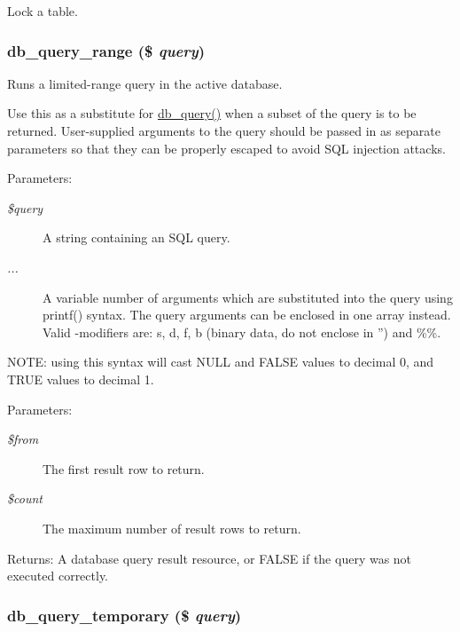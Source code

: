 Lock a table. \hypertarget{database_8mysql_8inc_893cbcab2ecf321005eae4e278adc22b}{
\subsubsection[{db\_\-query\_\-range}]{\setlength{\rightskip}{0pt plus 5cm}db\_\-query\_\-range (\$ {\em query})}}
\label{database_8mysql_8inc_893cbcab2ecf321005eae4e278adc22b}


Runs a limited-range query in the active database.

Use this as a substitute for \hyperlink{database_8mysql-common_8inc_9e096321b86945d128746ac7bedce8f3}{db\_\-query()} when a subset of the query is to be returned. User-supplied arguments to the query should be passed in as separate parameters so that they can be properly escaped to avoid SQL injection attacks.

\begin{Desc}
\item[Parameters:]
\begin{description}
\item[{\em \$query}]A string containing an SQL query. \item[{\em ...}]A variable number of arguments which are substituted into the query using printf() syntax. The query arguments can be enclosed in one array instead. Valid -modifiers are: s, d, f, b (binary data, do not enclose in '') and \%\%.\end{description}
\end{Desc}
NOTE: using this syntax will cast NULL and FALSE values to decimal 0, and TRUE values to decimal 1.

\begin{Desc}
\item[Parameters:]
\begin{description}
\item[{\em \$from}]The first result row to return. \item[{\em \$count}]The maximum number of result rows to return. \end{description}
\end{Desc}
\begin{Desc}
\item[Returns:]A database query result resource, or FALSE if the query was not executed correctly. \end{Desc}
\hypertarget{database_8mysql_8inc_bce8dcddcded20016a1925824cd09efa}{
\subsubsection[{db\_\-query\_\-temporary}]{\setlength{\rightskip}{0pt plus 5cm}db\_\-query\_\-temporary (\$ {\em query})}}
\label{database_8mysql_8inc_bce8dcddcded20016a1925824cd09efa}


